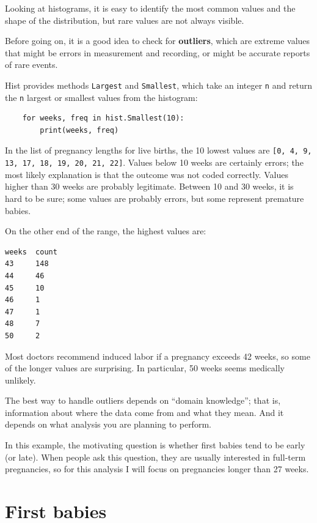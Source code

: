 \documentclass[12pt]{book}
\theoremstyle{exercise}
\begin{document}
Looking at histograms, it is easy to identify the most common
values and the shape of the distribution, but rare values are
not always visible.%

Before going on, it is a good idea to check for {\bf
  outliers}, which are extreme values that might be errors in
measurement and recording, or might be accurate reports of rare
events.%

Hist provides methods {\tt Largest} and {\tt Smallest}, which take
an integer {\tt n} and return the {\tt n} largest or smallest
values from the histogram:%

\begin{verbatim}
    for weeks, freq in hist.Smallest(10):
        print(weeks, freq)
\end{verbatim}

In the list of pregnancy lengths for live births, the 10 lowest values
are {\tt [0, 4, 9, 13, 17, 18, 19, 20, 21, 22]}.  Values below 10 weeks
are certainly errors; the most likely explanation is that the outcome
was not coded correctly.  Values higher than 30 weeks are probably
legitimate.  Between 10 and 30 weeks, it is hard to be sure; some
values are probably errors, but some represent premature babies.%

On the other end of the range, the highest values are:
%
\begin{verbatim}
weeks  count
43     148
44     46
45     10
46     1
47     1
48     7
50     2
\end{verbatim}

Most doctors recommend induced labor if a pregnancy exceeds 42 weeks,
so some of the longer values are surprising.  In particular, 50 weeks
seems medically unlikely.

The best way to handle outliers depends on ``domain knowledge'';
that is, information about where the data come from and what they
mean.  And it depends on what analysis you are planning to perform.%

In this example, the motivating question is whether first babies
tend to be early (or late).  When people ask this question, they are
usually interested in full-term pregnancies, so for this analysis
I will focus on pregnancies longer than 27 weeks.


\section{First babies}
\end{document}
